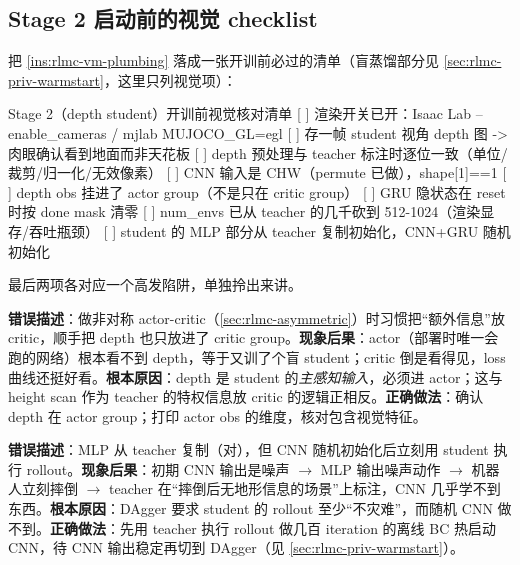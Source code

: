 \subsection{Stage 2 启动前的视觉 checklist}
\label{sec:rlmc-vm-checklist}

把 \cref{ins:rlmc-vm-plumbing} 落成一张开训前必过的清单（盲蒸馏部分见 \cref{sec:rlmc-priv-warmstart}，这里只列视觉项）：

\begin{codebox}{Stage 2（depth student）开训前视觉核对清单}
[ ] 渲染开关已开：Isaac Lab --enable_cameras / mjlab MUJOCO_GL=egl
[ ] 存一帧 student 视角 depth 图 -> 肉眼确认看到地面而非天花板
[ ] depth 预处理与 teacher 标注时逐位一致（单位/裁剪/归一化/无效像素）
[ ] CNN 输入是 CHW（permute 已做），shape[1]==1
[ ] depth obs 挂进了 actor group（不是只在 critic group）
[ ] GRU 隐状态在 reset 时按 done mask 清零
[ ] num_envs 已从 teacher 的几千砍到 512-1024（渲染显存/吞吐瓶颈）
[ ] student 的 MLP 部分从 teacher 复制初始化，CNN+GRU 随机初始化
\end{codebox}

最后两项各对应一个高发陷阱，单独拎出来讲。

\begin{pitfall}
\textbf{错误描述}：做非对称 actor-critic（\cref{sec:rlmc-asymmetric}）时习惯把“额外信息”放 critic，顺手把 depth 也只放进了 critic group。\textbf{现象后果}：actor（部署时唯一会跑的网络）根本看不到 depth，等于又训了个盲 student；critic 倒是看得见，loss 曲线还挺好看。\textbf{根本原因}：depth 是 student 的\emph{主感知输入}，必须进 actor；这与 height scan 作为 teacher 的特权信息放 critic 的逻辑正相反。\textbf{正确做法}：确认 depth 在 actor group；打印 actor obs 的维度，核对包含视觉特征。
\end{pitfall}

\begin{pitfall}
\textbf{错误描述}：MLP 从 teacher 复制（对），但 CNN 随机初始化后立刻用 student 执行 rollout。\textbf{现象后果}：初期 CNN 输出是噪声 $\to$ MLP 输出噪声动作 $\to$ 机器人立刻摔倒 $\to$ teacher 在“摔倒后无地形信息的场景”上标注，CNN 几乎学不到东西。\textbf{根本原因}：DAgger 要求 student 的 rollout 至少“不灾难”，而随机 CNN 做不到。\textbf{正确做法}：先用 teacher 执行 rollout 做几百 iteration 的离线 BC 热启动 CNN，待 CNN 输出稳定再切到 DAgger（见 \cref{sec:rlmc-priv-warmstart}）。
\end{pitfall}

